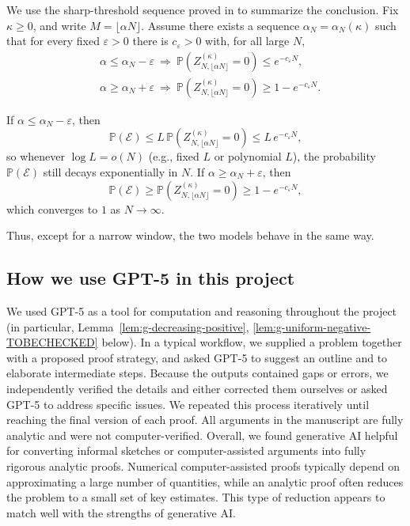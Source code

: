 \documentclass[11pt]{article}
\begin{document}
We use the sharp-threshold sequence proved in \cite{Xu2021, NakajimaSun2022} to summarize the conclusion.
Fix $\kappa\ge 0$, and write $M=\lfloor \alpha N\rfloor$.
Assume there exists a sequence $\alpha_N=\alpha_N(\kappa)$ such that for every fixed $\varepsilon>0$ there is $c_\varepsilon>0$ with, for all large $N$,
\begin{equation}\label{eq:sharp-seq-exp}
\begin{split}
 & \alpha\le \alpha_N-\varepsilon
\ \Longrightarrow\
\mathbb P\!\left(Z_{N,\lfloor \alpha N\rfloor}^{(\kappa)}=0\right)\le e^{-c_\varepsilon N},\\
&\alpha\ge \alpha_N+\varepsilon
\ \Longrightarrow\
\mathbb P\!\left(Z_{N,\lfloor \alpha N\rfloor}^{(\kappa)}=0\right)\ge 1-e^{-c_\varepsilon N}.
\end{split}
\end{equation}

If $\alpha\le \alpha_N-\varepsilon$, then
\[
\mathbb P(\mathcal E)\le L\,\mathbb P\!\left(Z_{N,\lfloor \alpha N\rfloor}^{(\kappa)}=0\right)\le L\,e^{-c_\varepsilon N},
\]
so whenever $\log L=o(N)$ (e.g., fixed $L$ or polynomial $L$), the probability $\mathbb P(\mathcal E)$ still decays exponentially in $N$. If $\alpha\ge \alpha_N+\varepsilon$, then
\[
\mathbb P(\mathcal E)\ge \mathbb P\!\left(Z_{N,\lfloor \alpha N\rfloor}^{(\kappa)}=0\right)\ge 1-e^{-c_\varepsilon N},
\]
which converges to $1$ as $N\to \infty$.

Thus, except for a narrow window, the two models behave in the same way.

\subsection{How we use GPT-5 in this project}
We used GPT-5 as a tool for computation and reasoning throughout the project (in particular, Lemma~\ref{lem:g-decreasing-positive}, \ref{lem:g-uniform-negative-TOBECHECKED} below). In a typical workflow, we supplied a problem together with a proposed proof strategy, and asked GPT-5 to suggest an outline and to elaborate intermediate steps. Because the outputs contained gaps or errors, we independently verified the details and either corrected them ourselves or asked GPT-5 to address specific issues. We repeated this process iteratively until reaching the final version of each proof. All arguments in the manuscript are fully analytic and were not computer-verified. Overall, we found generative AI helpful for converting informal sketches or computer-assisted arguments into fully rigorous analytic proofs. Numerical computer-assisted proofs typically depend on approximating a large number of quantities, while an analytic proof often reduces the problem to a small set of key estimates. This type of reduction appears to match well with the strengths of generative AI.
\end{document}
